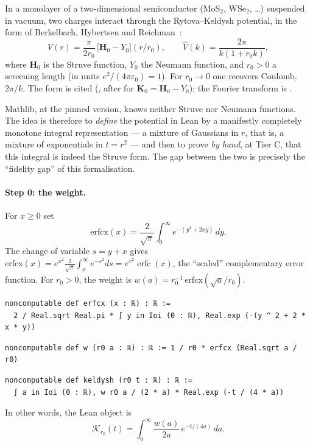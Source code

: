 \begin{physbox}
In a monolayer of a two-dimensional semiconductor (MoS$_2$, WSe$_2$, \dots) suspended in vacuum, two charges
interact through the Rytova--Keldysh potential, in the form of Berkelbach, Hybertsen and Reichman~\cite{ch2bhr}:
\[V(r)=\frac{\pi}{2r_0}\,\bigl[\mathbf H_0-Y_0\bigr](r/r_0),\qquad \widehat V(k)=\frac{2\pi}{k(1+r_0k)},\]
where $\mathbf H_0$ is the Struve function, $Y_0$ the Neumann function, and $r_0>0$ a screening length
(in units $e^2/(4\pi\varepsilon_0)=1$). For $r_0\to0$ one recovers Coulomb, $2\pi/k$. The form is cited \tierL{}
(\cite{ch2bhr}, after \cite{ch2dlmf} for $\mathbf K_0=\mathbf H_0-Y_0$); the Fourier transform is \tierC.
\end{physbox}

Mathlib, at the pinned version, knows neither Struve nor Neumann functions. The idea is therefore to \emph{define} the
potential in Lean by a manifestly completely monotone integral representation --- a mixture of Gaussians in $r$, that is,
a mixture of exponentials in $t=r^2$ --- and then to prove \emph{by hand}, at Tier C, that this integral is indeed
the Struve form. The gap between the two is precisely the ``fidelity gap'' of this formalisation.

\paragraph{Step 0: the weight.} For $x\ge0$ set
\[\mathrm{erfcx}(x)=\frac{2}{\sqrt\pi}\int_0^\infty e^{-(y^2+2xy)}\,dy .\]
The change of variable $s=y+x$ gives $\mathrm{erfcx}(x)=e^{x^2}\frac2{\sqrt\pi}\int_x^\infty e^{-s^2}ds=e^{x^2}\operatorname{erfc}(x)$,
the ``scaled'' complementary error function. For $r_0>0$, the weight is $w(a)=r_0^{-1}\,\mathrm{erfcx}(\sqrt a/r_0)$.
\begin{leanbox}
\begin{lstlisting}[style=chdeux]
noncomputable def erfcx (x : ℝ) : ℝ :=
  2 / Real.sqrt Real.pi * ∫ y in Ioi (0 : ℝ), Real.exp (-(y ^ 2 + 2 * x * y))
\end{lstlisting}
\begin{lstlisting}[style=chdeux]
noncomputable def w (r0 a : ℝ) : ℝ := 1 / r0 * erfcx (Real.sqrt a / r0)
\end{lstlisting}
\begin{lstlisting}[style=chdeux]
noncomputable def keldysh (r0 t : ℝ) : ℝ :=
  ∫ a in Ioi (0 : ℝ), w r0 a / (2 * a) * Real.exp (-t / (4 * a))
\end{lstlisting}
\end{leanbox}
\noindent In other words, the Lean object is
\begin{equation}\label{ch2:eq:kmix}
\mathcal K_{r_0}(t)=\int_0^\infty\frac{w(a)}{2a}\,e^{-t/(4a)}\,da .
\end{equation}

